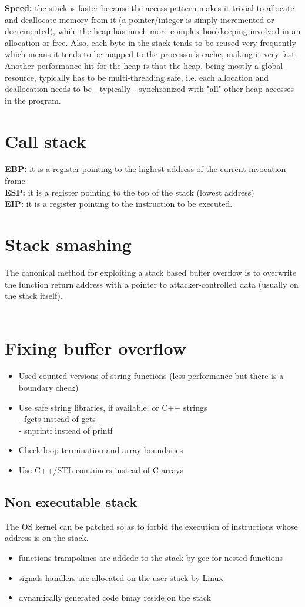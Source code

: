 \documentclass[10pt,a4paper]{book}
\begin{document}
\textbf{Speed:} the stack is faster because the access pattern makes it trivial to allocate and deallocate memory from it (a pointer/integer is simply incremented or decremented), while the heap has much more complex bookkeeping involved in an allocation or free. Also, each byte in the stack tends to be reused very frequently which means it tends to be mapped to the processor's cache, making it very fast. Another performance hit for the heap is that the heap, being mostly a global resource, typically has to be multi-threading safe, i.e. each allocation and deallocation needs to be - typically - synchronized with "all" other heap accesses in the program.
\section{Call stack}
\textbf{EBP:} it is a register pointing to the highest address of the current invocation frame\\
\textbf{ESP:} it is a register pointing to the top of the stack (lowest address)\\
\textbf{EIP:} it is a register pointing to the instruction to be executed.

\section{Stack smashing}
The canonical method for exploiting a stack based buffer overflow is to overwrite the function return address with a pointer to attacker-controlled data (usually on the stack itself).\\\\
\section{Fixing buffer overflow}
\begin{itemize}
\item Used counted versions of string functions (less performance but there is a boundary check)
\item Use safe string libraries, if available, or C++ strings\\
- fgets instead of gets\\
- snprintf instead of printf
\item Check loop termination and array boundaries
\item Use C++/STL containers instead of C arrays
\end{itemize}
\subsection{Non executable stack}
The OS kernel can be patched so as to forbid the execution of instructions whose address is on the stack.
\begin{itemize}
\item functions trampolines are addede to the stack by gcc for nested functions
\item signals handlers are allocated on the user stack by Linux
\item dynamically generated code bmay reside on the stack
\end{itemize}
\end{document}
